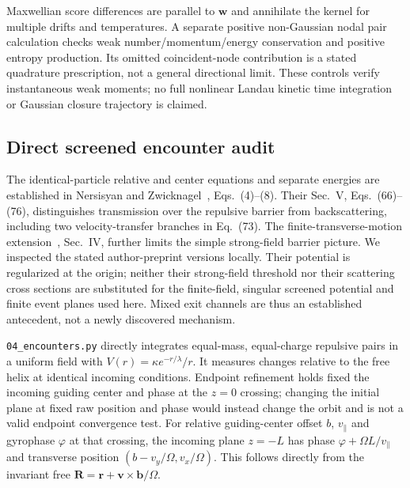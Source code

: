 \documentclass[11pt,letterpaper]{article}
\begin{document}
Maxwellian score differences are parallel to $\bm w$ and annihilate the kernel
for multiple drifts and temperatures. A separate positive non-Gaussian nodal
pair calculation checks weak number/momentum/energy conservation and positive
entropy production. Its omitted coincident-node contribution is a stated
quadrature prescription, not a general directional limit. These controls
verify instantaneous weak moments; no full nonlinear Landau kinetic time
integration or Gaussian closure trajectory is claimed.

\subsection*{Direct screened encounter audit}

The identical-particle relative and center equations and separate energies
are established in Nersisyan and Zwicknagel~\cite{NZ09}, Eqs.~(4)--(8).
Their Sec.~V, Eqs.~(66)--(76), distinguishes transmission over the repulsive
barrier from backscattering, including two velocity-transfer branches in
Eq.~(73). The finite-transverse-motion extension~\cite{NZ10}, Sec.~IV,
further limits the simple strong-field barrier picture. We inspected the
stated author-preprint versions locally. Their potential is regularized at
the origin; neither their strong-field threshold nor their scattering
cross sections are substituted for the finite-field, singular screened
potential and finite event planes used here. Mixed exit channels are thus
an established antecedent, not a newly discovered mechanism.

\texttt{04\_encounters.py} directly integrates equal-mass, equal-charge repulsive
pairs in a uniform field with $V(r)=\kappa e^{-r/\lambda}/r$. It measures changes
relative to the free helix at identical incoming conditions. Endpoint refinement
holds fixed the incoming guiding center and phase at the $z=0$ crossing;
changing the initial plane at fixed raw position and phase would instead
change the orbit and is not a valid endpoint convergence test.
For relative guiding-center offset $b$, $v_\parallel$ and gyrophase $\varphi$
at that crossing, the incoming plane $z=-L$ has phase
$\varphi+\Omega L/v_\parallel$ and transverse position
$(b-v_y/\Omega,v_x/\Omega)$. This follows directly from the invariant free
$\bm R=\bm r+\bm v\times\bm b/\Omega$.
\end{document}
